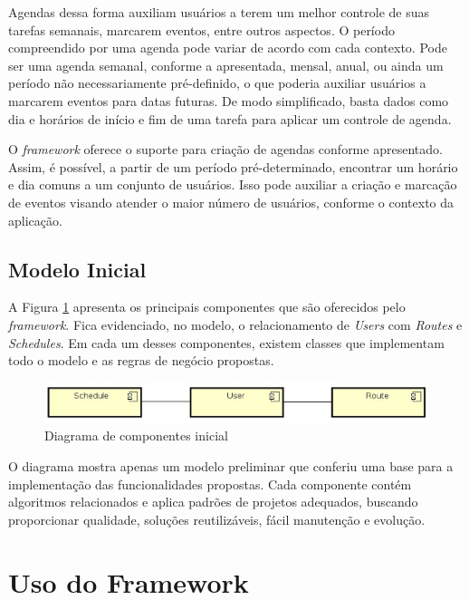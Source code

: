 Agendas dessa forma auxiliam usuários a terem um melhor controle de suas tarefas semanais, marcarem eventos, entre outros aspectos. O período compreendido por uma agenda pode variar de acordo com cada contexto. Pode ser uma agenda semanal, conforme a apresentada, mensal, anual, ou ainda um período não necessariamente pré-definido, o que poderia auxiliar usuários a marcarem eventos para datas futuras. De modo simplificado, basta dados como dia e horários de início e fim de uma tarefa para aplicar um controle de agenda.

O \textit{framework} oferece o suporte para criação de agendas conforme apresentado. Assim, é possível, a partir de um período pré-determinado, encontrar um horário e dia comuns a um conjunto de usuários. Isso pode auxiliar a criação e marcação de eventos visando atender o maior número de usuários, conforme o contexto da aplicação.

\subsection{Modelo Inicial}

A Figura \ref{diagrama de componentes} apresenta os principais componentes que são oferecidos pelo \textit{framework}. Fica evidenciado, no modelo, o relacionamento de \textit{Users} com \textit{Routes} e \textit{Schedules}. Em cada um desses componentes, existem classes que implementam todo o modelo e as regras de negócio propostas.

\begin{figure}[!h]
	\centering
	\includegraphics[scale=0.55]{figuras/proposta/diagrama_componentes.eps}
	\caption{Diagrama de componentes inicial}
	\label{diagrama de componentes}
\end{figure}

O diagrama mostra apenas um modelo preliminar que conferiu uma base para a implementação das funcionalidades propostas. Cada componente contém algoritmos relacionados e aplica padrões de projetos adequados, buscando proporcionar qualidade, soluções reutilizáveis, fácil manutenção e evolução.

\section{Uso do Framework}


